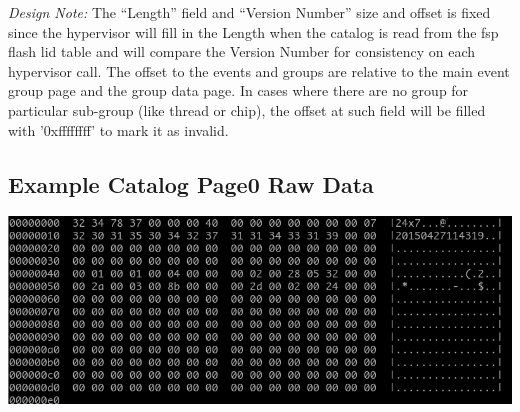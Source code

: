\documentclass[14]{article}
\begin{document}
\textit{Design Note:} The ``Length'' field and ``Version Number'' size and offset is fixed
since the hypervisor will fill in the Length when the catalog is read from the
fsp flash lid table and will compare the Version Number for consistency on each
hypervisor call. The offset to the events and groups are relative to the main
event group page and the group data page. In cases where there are no group for
particular sub-group (like thread or chip), the offset at such field will be
filled with '0xffffffff' to mark it as invalid.

\subsection{Example Catalog Page0 Raw Data}
\includegraphics[scale=0.6]{page0_raw.png}

\pagebreak
\end{document}
